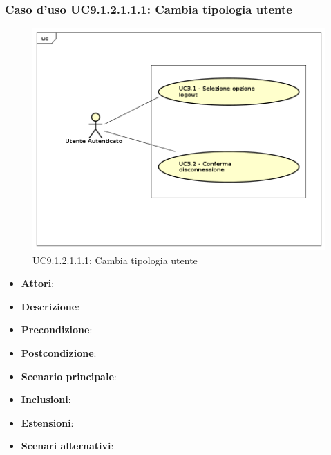 						\subsubsection{Caso d'uso UC9.1.2.1.1.1: Cambia tipologia utente}
						\label{UC9.1.2.1.1.1}
						\begin{figure}[h]
							\centering
						\includegraphics[scale=0.7,keepaspectratio]{UML/UC9.png}
							\caption{UC9.1.2.1.1.1: Cambia tipologia utente}
						\end{figure}
						\FloatBarrier
						\begin{itemize}
							\item \textbf{Attori}: 
							\item \textbf{Descrizione}: 
							\item \textbf{Precondizione}: 
							\item \textbf{Postcondizione}: 
							\item \textbf{Scenario principale}:
							\item \textbf{Inclusioni}:
							\item \textbf{Estensioni}:
							\item \textbf{Scenari alternativi}:
						\end{itemize}
						
